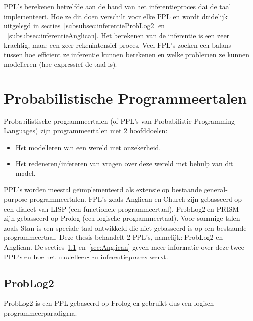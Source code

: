 \documentclass[12pt,a4paper,oneside]{book}
\theoremstyle{definition}
\begin{document}
\\\\
PPL's berekenen hetzelfde aan de hand van het inferentieproces dat de taal implementeert. Hoe ze dit doen verschilt voor elke PPL en wordt duidelijk uitgelegd in secties~\ref{subsubsec:inferentieProbLog2} en ~\ref{subsubsec:inferentieAnglican}. Het berekenen van de inferentie is een zeer krachtig, maar een zeer rekenintensief proces. Veel PPL's zoeken een balans tussen hoe efficient ze inferentie kunnen berekenen en welke problemen ze kunnen modelleren (hoe expressief de taal is).

\section{Probabilistische Programmeertalen}
Probabilistische programmeertalen (of PPL's van Probabilistic Programming Languages) zijn programmeertalen met 2 hoofddoelen:
\begin{itemize}
  \item Het modelleren van een wereld met onzekerheid.
  \item Het redeneren/infereren van vragen over deze wereld met behulp van dit model.
\end{itemize}
PPL's worden meestal ge\"{i}mplementeerd als extensie op bestaande general-purpose programmeertalen. PPL's zoals Anglican en Church zijn gebasseerd op een dialect van LISP (een functionele programmeertaal). ProbLog2 en PRISM zijn gebasseerd op Prolog (een logische programmeertaal). Voor sommige talen zoals Stan is een speciale taal ontwikkeld die niet gebasseerd is op een bestaande programmeertaal.
Deze thesis behandelt 2 PPL's, namelijk: ProbLog2 en Anglican. De secties~\ref{sec:ProbLog2} en~\ref{sec:Anglican} geven meer informatie over deze twee PPL's en hoe het modelleer- en inferentieproces werkt.
\subsection{ProbLog2}
\label{sec:ProbLog2}
ProbLog2 is een PPL gebaseerd op Prolog en gebruikt dus een logisch programmeerparadigma. 
\end{document}

